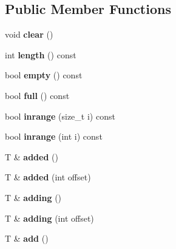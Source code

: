 \subsection*{Public Member Functions}
\begin{DoxyCompactItemize}
\item 
\mbox{\label{structqueue_aeb2320f9aaeed84b67859eb26aa921af}} 
void {\bfseries clear} ()
\item 
\mbox{\label{structqueue_a69cfdb1d9c91e1b4b9c8c4415ed02fee}} 
int {\bfseries length} () const
\item 
\mbox{\label{structqueue_aadda1e91372e05c3016e56f1531b9e34}} 
bool {\bfseries empty} () const
\item 
\mbox{\label{structqueue_a626013ae067a5a998afedae22abe8c73}} 
bool {\bfseries full} () const
\item 
\mbox{\label{structqueue_a7a3b2070037f7a6626756d7ce731463b}} 
bool {\bfseries inrange} (size\+\_\+t i) const
\item 
\mbox{\label{structqueue_a2229432886e52c4000d643c9930c2e32}} 
bool {\bfseries inrange} (int i) const
\item 
\mbox{\label{structqueue_a5ffa5bf359bd75dccde914a4fede5952}} 
T \& {\bfseries added} ()
\item 
\mbox{\label{structqueue_ab382e3fa84085c94213a2a1649dee209}} 
T \& {\bfseries added} (int offset)
\item 
\mbox{\label{structqueue_ab6a1afef29b56f20fbdf243ff8129cfd}} 
T \& {\bfseries adding} ()
\item 
\mbox{\label{structqueue_a35109a4558cf3829240b77a0a71c8c3a}} 
T \& {\bfseries adding} (int offset)
\item 
\mbox{\label{structqueue_a88ec16bf4f8c057b15e27e99aa71b057}} 
T \& {\bfseries add} ()
\item 
\mbox{\label{structqueue_a539d478368385e622123c5f36e7cff33}} 

\end{DoxyCompactItemize}
